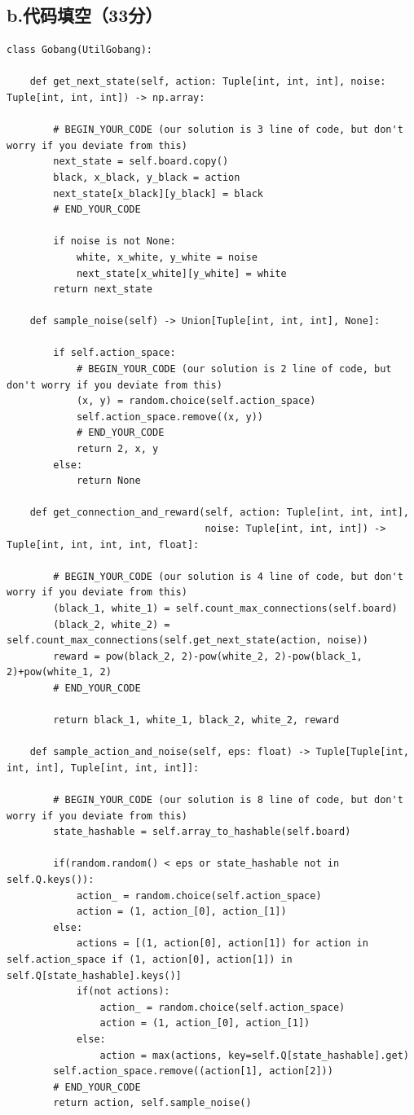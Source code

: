 \documentclass{article}
\begin{document}
\subsection*{b.代码填空（33分）}
\begin{lstlisting}
class Gobang(UtilGobang):
    
    def get_next_state(self, action: Tuple[int, int, int], noise: Tuple[int, int, int]) -> np.array:

        # BEGIN_YOUR_CODE (our solution is 3 line of code, but don't worry if you deviate from this)
        next_state = self.board.copy()
        black, x_black, y_black = action
        next_state[x_black][y_black] = black
        # END_YOUR_CODE

        if noise is not None:
            white, x_white, y_white = noise
            next_state[x_white][y_white] = white
        return next_state

    def sample_noise(self) -> Union[Tuple[int, int, int], None]:

        if self.action_space:
            # BEGIN_YOUR_CODE (our solution is 2 line of code, but don't worry if you deviate from this)
            (x, y) = random.choice(self.action_space)
            self.action_space.remove((x, y))
            # END_YOUR_CODE
            return 2, x, y
        else:
            return None

    def get_connection_and_reward(self, action: Tuple[int, int, int],
                                  noise: Tuple[int, int, int]) -> Tuple[int, int, int, int, float]:

        # BEGIN_YOUR_CODE (our solution is 4 line of code, but don't worry if you deviate from this)
        (black_1, white_1) = self.count_max_connections(self.board)
        (black_2, white_2) = self.count_max_connections(self.get_next_state(action, noise))
        reward = pow(black_2, 2)-pow(white_2, 2)-pow(black_1, 2)+pow(white_1, 2)
        # END_YOUR_CODE

        return black_1, white_1, black_2, white_2, reward

    def sample_action_and_noise(self, eps: float) -> Tuple[Tuple[int, int, int], Tuple[int, int, int]]:

        # BEGIN_YOUR_CODE (our solution is 8 line of code, but don't worry if you deviate from this)
        state_hashable = self.array_to_hashable(self.board)
        
        if(random.random() < eps or state_hashable not in self.Q.keys()):
            action_ = random.choice(self.action_space)
            action = (1, action_[0], action_[1])
        else:
            actions = [(1, action[0], action[1]) for action in self.action_space if (1, action[0], action[1]) in self.Q[state_hashable].keys()]
            if(not actions):
                action_ = random.choice(self.action_space)
                action = (1, action_[0], action_[1])
            else:
                action = max(actions, key=self.Q[state_hashable].get)
        self.action_space.remove((action[1], action[2]))
        # END_YOUR_CODE
        return action, self.sample_noise()


\end{lstlisting}
\end{document}
